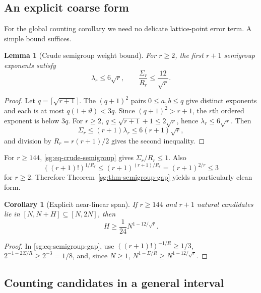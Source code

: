 \documentclass[11pt,oneside]{article}
\newtheorem{lemma}[theorem]{Lemma}
\newtheorem{corollary}[theorem]{Corollary}
\theoremstyle{definition}
\theoremstyle{remark}
\newcommand{\thetaq}{\vartheta}
\begin{document}
\subsection{An explicit coarse form}

For the global counting corollary we need no delicate lattice-point error term.  A simple
bound suffices.

\begin{lemma}[Crude semigroup weight bound]
\label{sg:lem-crude-semigroup}
For $r\ge2$, the first $r+1$ semigroup exponents satisfy
\begin{equation}
 \lambda_r\le6\sqrt r,
 \qquad
 \frac{\Sigma_r}{R_r}\le\frac{12}{\sqrt r}.
 \label{sg:eq-crude-semigroup}
\end{equation}
\end{lemma}

\begin{proof}
Let $q=\lceil\sqrt{r+1}\rceil$.  The $(q+1)^2$ pairs
$0\le a,b\le q$ give distinct exponents and each is at most
$q(1+\thetaq)<3q$.  Since $(q+1)^2>r+1$, the $r$th ordered exponent is below $3q$.
For $r\ge2$,
$q\le\sqrt{r+1}+1\le2\sqrt r$, hence $\lambda_r\le6\sqrt r$.
Then
\[
 \Sigma_r\le(r+1)\lambda_r\le6(r+1)\sqrt r,
\]
and division by $R_r=r(r+1)/2$ gives the second inequality.
\end{proof}

For $r\ge144$, \eqref{sg:eq-crude-semigroup} gives $\Sigma_r/R_r\le1$.  Also
\[
 ((r+1)!)^{1/R_r}
 \le(r+1)^{(r+1)/R_r}
 =(r+1)^{2/r}\le3
\]
for $r\ge2$.  Therefore Theorem~\ref{sg:thm-semigroup-gap} yields a particularly clean form.

\begin{corollary}[Explicit near-linear span]
\label{sg:cor-explicit-semigroup-span}
If $r\ge144$ and $r+1$ natural candidates lie in
$[N,N+H]\subseteq[N,2N]$, then
\begin{equation}
 H\ge\frac1{24}N^{1-12/\sqrt r}.
 \label{sg:eq-explicit-semigroup-span}
\end{equation}
\end{corollary}

\begin{proof}
In \eqref{sg:eq-semigroup-gap}, use
$((r+1)!)^{-1/R}\ge1/3$,
$2^{-1-2\Sigma/R}\ge2^{-3}=1/8$, and, since $N\ge1$,
$N^{1-\Sigma/R}\ge N^{1-12/\sqrt r}$.
\end{proof}

\subsection{Counting candidates in a general interval}
\end{document}
